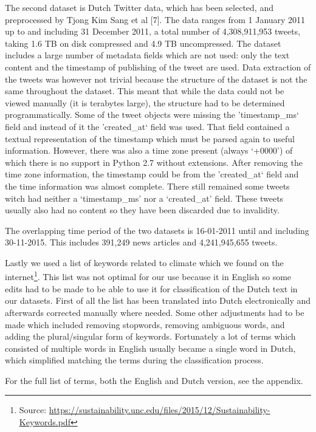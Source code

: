 \documentclass[paper=a4, fontsize=9px]{scrartcl} %
\numberwithin{equation}{section} %
\numberwithin{figure}{section} %
\numberwithin{table}{section} %
\begin{document}
\begin{multicols}{2}
The second dataset is Dutch Twitter data, which has been selected, and preprocessed by Tjong Kim Sang et al [7]. The data ranges from 1 January 2011 up to and including 31 December 2011, a total number of 4,308,911,953 tweets, taking 1.6 TB on disk compressed and 4.9 TB uncompressed. The dataset includes a large number of metadata fields which are not used: only the text content and the timestamp of publishing of the tweet are used. Data extraction of the tweets was however not trivial because the structure of the dataset is not the same throughout the dataset. This meant that while the data could not be viewed manually (it is terabytes large), the structure had to be determined programmatically. Some of the tweet objects were missing the 'timestamp\_ms` field and instead of it the 'created\_at` field was used. That field contained a textual representation of the timestamp which must be parsed again to useful information. However, there was also a time zone present (always `+0000’) of which there is no support in Python 2.7 without extensions. After removing the time zone information, the timestamp could be from the 'created\_at` field and the time information was almost complete. There still remained some tweets witch had neither a `timestamp\_ms’ nor a `created\_at’ field. These tweets usually also had no content so they have been discarded due to invalidity. 

The overlapping time period of the two datasets is 16-01-2011 until and including 30-11-2015. This includes 391,249 news articles and 4,241,945,655 tweets.

Lastly we used a list of keywords related to climate which we found on the internet\footnote{Source: \url{https://sustainability.unc.edu/files/2015/12/Sustainability-Keywords.pdf}}. This list was not optimal for our use because it in English so some edits had to be made to be able to use it for classification of the Dutch text in our datasets. First of all the list has been translated into Dutch electronically and afterwards corrected manually where needed. Some other adjustments had to be made which included removing stopwords, removing ambiguous words, and adding the plural/singular form of keywords. Fortunately a lot of terms which consisted of multiple words in English usually became a single word in Dutch, which simplified matching the terms during the classification process. 

For the full list of terms, both the English and Dutch version, see the appendix.


\end{multicols}
\end{document}
